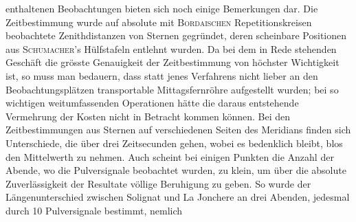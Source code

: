 enthaltenen Beobachtungen bieten sich noch einige Bemerkungen dar. Die Zeitbestimmung wurde auf absolute mit \textsc{Bordaischen} Repetitionskreisen beobachtete Zenithdistanzen von Sternen gegründet, deren scheinbare Positionen aus \textsc{Schumacher}'s Hülfstafeln entlehnt wurden. Da bei dem in Rede stehenden Geschäft die grösste Genauigkeit der Zeitbestimmung von höchster Wichtigkeit ist, so muss man bedauern, dass statt jenes Verfahrens nicht lieber an den Beobachtungsplätzen transportable Mittagsfernröhre aufgestellt wurden; bei so wichtigen weitumfassenden Operationen hätte die daraus entstehende Vermehrung der Kosten nicht in Betracht kommen können. Bei den Zeitbestimmungen aus Sternen auf verschiedenen Seiten des Meridians finden sich Unterschiede, die über drei Zeitsecunden gehen, wobei es bedenklich bleibt, blos den Mittelwerth zu nehmen. Auch scheint bei einigen Punkten die Anzahl der Abende, wo die Pulversignale beobachtet wurden, zu klein, um über die absolute Zuverlässigkeit der Resultate völlige Beruhigung zu geben. So wurde der Längenunterschied zwischen Solignat und La Jonchere an drei Abenden, jedesmal durch 10 Pulversignale bestimmt, nemlich 

